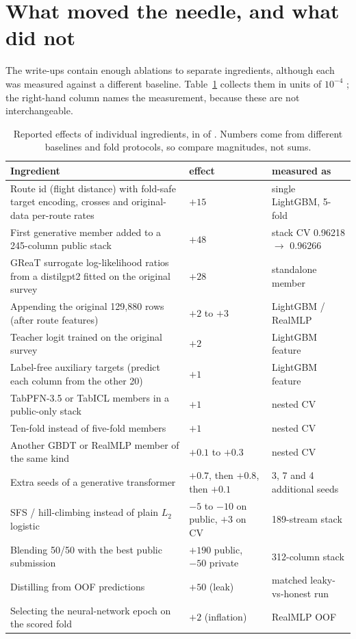 \section{What moved the needle, and what did not}
\label{sec:evidence}

The write-ups contain enough ablations to separate ingredients, although each was measured
against a different baseline. Table~\ref{tab:deltas} collects them in units of $10^{-4}$
\auc; the right-hand column names the measurement, because these are not interchangeable.

\begin{table}[t]
\centering
\small
\caption{Reported effects of individual ingredients, in \dlt{} of \auc. Numbers come from
different baselines and fold protocols, so compare magnitudes, not sums.}
\label{tab:deltas}
\begin{tabular}{p{5.6cm}p{2.2cm}p{5.2cm}}
\toprule
Ingredient & effect & measured as\\
\midrule
Route id (flight distance) with fold-safe target encoding, crosses and original-data
  per-route rates & $+15$ & single LightGBM, 5-fold \citep{kaggle_twentyninth}\\
First generative member added to a 245-column public stack & $+48$ & stack CV
  0.96218 $\to$ 0.96266 \citep{kaggle_first}\\
GReaT surrogate log-likelihood ratios from a distilgpt2 fitted on the original survey
  & $+28$ & standalone member \citep{kaggle_sixteenth}\\
Appending the original 129{,}880 rows (after route features) & $+2$ to $+3$
  & LightGBM / RealMLP \citep{kaggle_twentyninth}\\
Teacher logit trained on the original survey & $+2$ & LightGBM feature\\
Label-free auxiliary targets (predict each column from the other 20) & $+1$ & LightGBM feature\\
TabPFN-3.5 or TabICL members in a public-only stack & $+1$ & nested CV \citep{kaggle_publicstack}\\
Ten-fold instead of five-fold members & $+1$ & nested CV \citep{kaggle_publicstack}\\
Another GBDT or RealMLP member of the same kind & $+0.1$ to $+0.3$ & nested CV\\
Extra seeds of a generative transformer & $+0.7$, then $+0.8$, then $+0.1$
  & 3, 7 and 4 additional seeds \citep{kaggle_seventh}\\
SFS / hill-climbing instead of plain $L_2$ logistic & $-5$ to $-10$ on public, $+3$ on CV
  & 189-stream stack \citep{kaggle_fourth}\\
Blending 50/50 with the best public submission & $+190$ public, $-50$ private
  & 312-column stack \citep{kaggle_sixteenth}\\
Distilling from OOF predictions & $+50$ (leak) & matched leaky-vs-honest run
  \citep{kaggle_twentyninth}\\
Selecting the neural-network epoch on the scored fold & $+2$ (inflation) & RealMLP OOF
  \citep{kaggle_twentyninth}\\
\bottomrule
\end{tabular}
\end{table}

